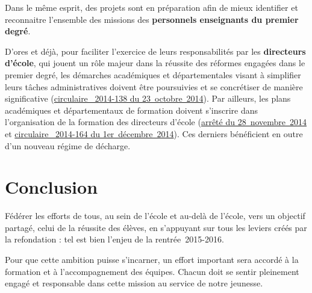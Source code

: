Dans le même esprit, des projets sont en préparation afin de mieux identifier et reconnaitre l’ensemble des missions des \textbf{personnels enseignants du premier degré}.

D’ores et déjà, pour faciliter l’exercice de leurs responsabilités par les \textbf{directeurs d’école}, qui jouent un rôle majeur dans la réussite des réformes engagées dans le premier degré, les démarches académiques et départementales visant à simplifier leurs tâches administratives doivent être poursuivies et se concrétiser de manière significative (\href{http://www.education.gouv.fr/pid25535/bulletin_officiel.html?cid_bo=83288}{circulaire \no{}~2014-138 du 23~octobre~2014}). Par ailleurs, les plans académiques et départementaux de formation doivent s’inscrire dans l’organisation de la formation des directeurs d’école (\href{http://www.education.gouv.fr/pid25535/bulletin_officiel.html?cid_bo=84361}{arrêté du 28~novembre~2014} et \href{http://www.education.gouv.fr/pid25535/bulletin_officiel.html?cid_bo=84367}{circulaire \no{}~2014-164 du 1er~décembre~2014}). Ces derniers bénéficient en outre d’un nouveau régime de décharge.

\section*{Conclusion}
Fédérer les efforts de tous, au sein de l’école et au-delà de l’école, vers un objectif partagé, celui de la réussite des élèves, en s’appuyant sur tous les leviers créés par la refondation : tel est bien l’enjeu de la rentrée~2015-2016.

Pour que cette ambition puisse s’incarner, un effort important sera accordé à la formation et à l’accompagnement des équipes. Chacun doit se sentir pleinement engagé et responsable dans cette mission au service de notre jeunesse.
